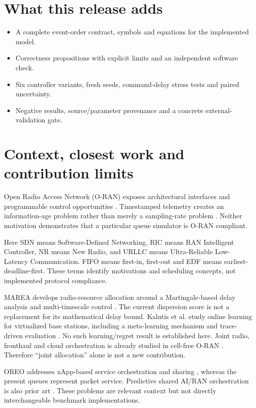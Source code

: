 \documentclass[10pt,a4paper]{article}
\newcommand{\page}[1]{\clearpage\section{#1}}
\begin{document}
\section*{What this release adds}
\begin{itemize}
\item A complete event-order contract, symbols and equations for the implemented model.
\item Correctness propositions with explicit limits and an independent software check.
\item Six controller variants, fresh seeds, command-delay stress tests and paired uncertainty.
\item Negative results, source/parameter provenance and a concrete external-validation gate.
\end{itemize}

\page{Context, closest work and contribution limits}
Open Radio Access Network (O-RAN) exposes architectural interfaces and programmable control opportunities
\cite{polese}. Timestamped telemetry creates an information-age problem rather
than merely a sampling-rate problem \cite{age}. Neither motivation demonstrates
that a particular queue simulator is O-RAN compliant.

Here SDN means Software-Defined Networking, RIC means RAN Intelligent Controller,
NR means New Radio, and URLLC means Ultra-Reliable Low-Latency Communication.
FIFO means first-in, first-out and EDF means earliest-deadline-first. These terms
identify motivations and scheduling concepts, not implemented protocol compliance.

MAREA develops radio-resource allocation around a Martingale-based delay analysis
and multi-timescale control \cite{marea}. The current dispersion score is not a
replacement for its mathematical delay bound. Kalntis et al. study online learning
for virtualized base stations, including a meta-learning mechanism and trace-driven
evaluation \cite{kalntis}. No such learning/regret result is established here.
Joint radio, fronthaul and cloud orchestration is already studied in cell-free
O-RAN \cite{demir}. Therefore ``joint allocation'' alone is not a new contribution.

OREO addresses xApp-based service orchestration and sharing \cite{oreo}, whereas
the present queues represent packet service. Predictive shared AI/RAN orchestration
is also prior art \cite{caora}. These problems are relevant context but not directly
interchangeable benchmark implementations.
\end{document}
